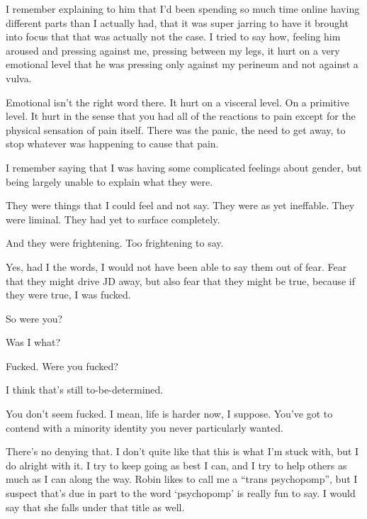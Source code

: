\begin{paracol}{2}
\begin{leftcolumn}
I remember explaining to him that I'd been spending so much time online having different parts than I actually had, that it was super jarring to have it brought into focus that that was actually not the case. I tried to say how, feeling him aroused and pressing against me, pressing between my legs, it hurt on a very emotional level that he was pressing only against my perineum and not against a vulva.

\begin{ally}
Emotional isn't the right word there. It hurt on a visceral level. On a primitive level. It hurt in the sense that you had all of the reactions to pain except for the physical sensation of pain itself. There was the panic, the need to get away, to stop whatever was happening to cause that pain.
\end{ally}
I remember saying that I was having some complicated feelings about gender, but being largely unable to explain what they were.

They were things that I could feel and not say. They were as yet ineffable. They were liminal. They had yet to surface completely.

\begin{ally}
And they were frightening. Too frightening to say.
\end{ally}
Yes, had I the words, I would not have been able to say them out of fear. Fear that they might drive JD away, but also fear that they might be true, because if they were true, I was fucked.
\newpage

\begin{ally}
So were you?
\end{ally}
Was I what?

\begin{ally}
Fucked. Were you fucked?
\end{ally}
I think that's still to-be-determined.

\begin{ally}
You don't seem fucked. I mean, life is harder now, I suppose. You've got to contend with a minority identity you never particularly wanted.
\end{ally}
There's no denying that. I don't quite like that this is what I'm stuck with, but I do alright with it. I try to keep going as best I can, and I try to help others as much as I can along the way. Robin likes to call me a ``trans psychopomp'', but I suspect that's due in part to the word `psychopomp' is really fun to say. I would say that she falls under that title as well.


\end{leftcolumn}
\end{paracol}

